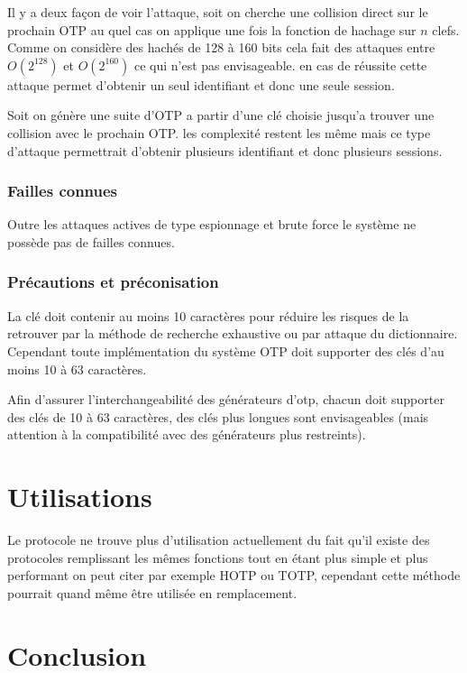 \documentclass{../res/univ-projet}
\begin{document}
        Il y a deux façon de voir l'attaque, soit on cherche une collision direct sur
    le prochain OTP au quel cas on applique une fois la fonction de hachage sur $n$ clefs.
    Comme on considère des hachés de 128 à 160 bits cela fait des attaques entre $O(2^128)$
    et $O(2^160)$ ce qui n'est pas envisageable. en cas de réussite cette attaque permet 
    d'obtenir un seul identifiant et donc une seule session.
    
        Soit on génère une suite d'OTP a partir d'une clé choisie jusqu'a trouver
    une collision avec le prochain OTP. les complexité restent les même mais ce type
    d'attaque permettrait d'obtenir plusieurs identifiant et donc plusieurs sessions.
    
    \subsubsection{Failles connues}
      Outre les attaques actives de type espionnage et brute force le système ne possède pas de failles connues.
    
    \subsubsection{Précautions et préconisation}
    La clé doit contenir au moins 10 caractères pour réduire les risques de la 
retrouver par la méthode de recherche exhaustive ou par attaque du dictionnaire. 
Cependant toute implémentation du système OTP doit supporter des clés d'au 
moins 10 à 63 caractères.

    Afin d'assurer l'interchangeabilité des générateurs d'otp, chacun doit 
supporter des clés de 10 à 63 caractères, des clés plus longues sont 
envisageables (mais attention à la compatibilité avec des générateurs plus 
restreints).
  
\section{Utilisations}
  Le protocole ne trouve plus d'utilisation actuellement du fait qu'il existe des protocoles remplissant
  les mêmes fonctions tout en étant plus simple et plus performant on peut citer par exemple HOTP ou TOTP, cependant
  cette méthode pourrait quand même être utilisée en remplacement.
  
\section{Conclusion}
\end{document}
